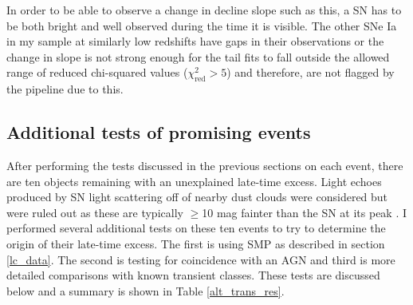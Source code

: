 \documentclass[a4paper,oneside,12pt, class=Latex/Classes/PhDthesisPSnPDF, crop=false]{standalone}
\begin{document}
In order to be able to observe a change in decline slope such as this, a SN has to be both bright and well observed during the time it is visible. The other SNe Ia in my sample at similarly low redshifts have gaps in their observations or the change in slope is not strong enough for the tail fits to fall outside the allowed range of reduced chi-squared values ($\chi^2_\text{red} > 5$) and therefore, are not flagged by the pipeline due to this.


\subsection{Additional tests of promising events}
\label{Additional_tests}
After performing the tests discussed in the previous sections on each event, there are ten objects remaining with an unexplained late-time excess. Light echoes produced by SN light scattering off of nearby dust clouds were considered but were ruled out as these are typically $\geq$10 mag fainter than the SN at its peak \citep{Patat_light_echoes, 2012cg}. I performed several additional tests on these ten events to try to determine the origin of their late-time excess. The first is using SMP as described in section \ref{lc_data}. The second is testing for coincidence with an AGN and third is more detailed comparisons with known transient classes. These tests are discussed below and a summary is shown in Table \ref{alt_trans_res}.
\end{document}
